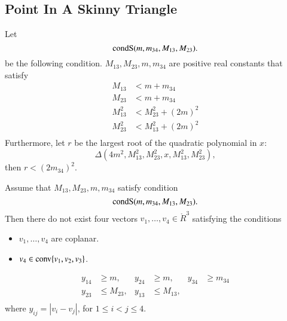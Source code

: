 \begin{tarskidata}
\begin{tarski}
\section{Point In A Skinny Triangle}

\begin{definition}[condS]
Let 
	$$
	{\operatorname{condS}}(m,m_{34},M_{13},M_{23}). 
	$$
be the following condition.
 $M_{13},M_{23},m,m_{34}$ are positive real constants
that satisfy 
	$$
	\begin{array}{rll}
		M_{13} &< m + m_{34}\\
		M_{23} &< m + m_{34}\\
		M_{13}^2 &< M_{23}^2 + (2m)^2\\
		M_{23}^2 &< M_{13}^2 + (2m)^2\\
	\end{array}
	$$
Furthermore, let $r$ be the largest root of the quadratic polynomial in $x$:
	$$\Delta(4m^2,M_{13}^2,M_{23}^2,x,M_{13}^2,M_{23}^2),$$
then $r < (2 m_{34})^2$.
\end{definition}
\end{tarski}




\begin{tarski}

\begin{lemma}
Assume that $M_{13},M_{23},m,m_{34}$ satisfy condition
   $${\operatorname{condS}}(m,m_{34},M_{13},M_{23}).$$
Then there do not exist four vectors
$v_1,\ldots,v_4\in\ring{R}^3$ satisfying the conditions
	\begin{itemize}
		\item $v_1,\ldots,v_4$ are coplanar.
		\item $v_4\in{\operatorname{conv}}\{v_1,v_2,v_3\}$.
	\end{itemize}
	$$
	\begin{array}{rlrlrl}
		y_{14} &\ge m, &y_{24} &\ge m, &y_{34}&\ge m_{34}\\
		y_{23} &\le  M_{23}, &y_{13} & \le M_{13}, &\\
	\end{array}
	$$
where
$y_{ij}=|v_i-v_j|$,
for $1\le i < j \le 4$.  
\end{lemma}


\end{tarski}
\end{tarskidata}
